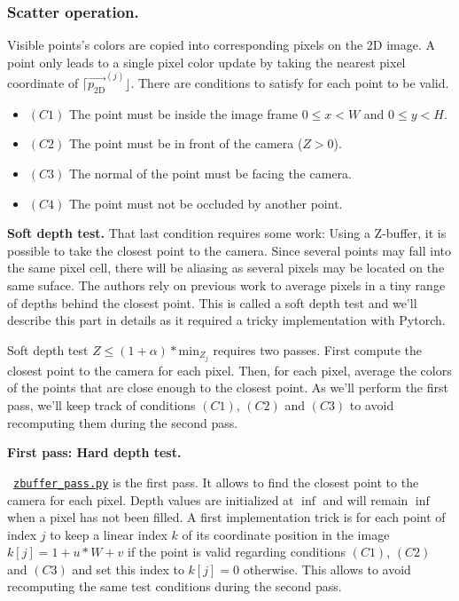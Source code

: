 \subsubsection{Scatter operation.}
\label{sec:scatter_op}

Visible points's colors are copied into corresponding pixels on the 2D image. A point only leads to a single pixel color update by taking the nearest pixel coordinate of $\lceil\vec{p_{\textrm{2D}}}^{(j)}\rfloor$. There are conditions to satisfy for each point to be valid. 
\begin{itemize}
    \item $(C1)$ The point must be inside the image frame $0\leq x<W$ and $0\leq y <H$.
    \item $(C2)$ The point must be in front of the camera ($Z>0$).
    \item $(C3)$ The normal of the point must be facing the camera.
    \item $(C4)$ The point must not be occluded by another point.
\end{itemize}

\noindent \textbf{Soft depth test.} 
That last condition requires some work:
Using a Z-buffer, it is possible to take the closest point to the camera. Since several points may fall into the same pixel cell, there will be aliasing as several pixels may be located on the same suface. The authors rely on previous work \cite{schutz2021rendering} to average pixels in a tiny range of depths behind the closest point. This is called a soft depth test and we'll describe this part in details as it required a tricky implementation with Pytorch.

Soft depth test $Z \leq (1 + \alpha) * \textrm{min}_{Z_{j}}$ requires two passes. First compute the closest point to the camera for each pixel. Then, for each pixel, average the colors of the points that are close enough to the closest point. As we'll perform the first pass, we'll keep track of conditions $(C1)$, $(C2)$ and $(C3)$ to avoid recomputing them during the second pass.

\noindent \textbf{First pass: Hard depth test.}

\noindent ~\href{https://github.com/balthazarneveu/per-pixel-point-rendering/blob/main/src/pixr/rendering/zbuffer\_pass.py#L5}{\texttt{zbuffer\_pass.py}} is the first pass. It allows to find the closest point to the camera for each pixel. Depth values are initialized at $\inf$ and will remain $\inf$ when a pixel has not been filled. A first implementation trick is for each point of index $j$ to keep a linear index $k$ of its coordinate position in the image $k[j] = 1+ u*W+v$ if the point is valid regarding conditions $(C1)$, $(C2)$ and $(C3)$ and set this index to $k[j]=0$ otherwise. This allows to avoid recomputing the same test conditions during the second pass.

